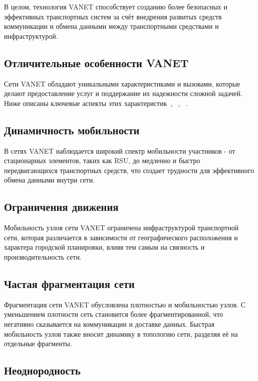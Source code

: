 В целом, технология VANET способствует созданию более безопасных и эффективных транспортных систем за счёт внедрения развитых средств коммуникации и обмена данными между транспортными средствами и инфраструктурой.

\newpage

\subsection*{Отличительные особенности VANET}

Сети VANET обладают уникальными характеристиками и вызовами, которые делают предоставление услуг и поддержание их надежности сложной задачей. Ниже описаны ключевые аспекты этих характеристик~\cite{hamdi2020review}, ~\cite{karagiannis2011vehicular}, ~\cite{raw2013security}.

\subsection*{Динамичность мобильности}

В сетях VANET наблюдается широкий спектр мобильности участников - от стационарных элементов, таких как RSU, до медленно и быстро передвигающихся транспортных средств, что создает трудности для эффективного обмена данными внутри сети.

\subsection*{Ограничения движения}

Мобильность узлов сети VANET ограничена инфраструктурой транспортной сети, которая различается в зависимости от географического расположения и характера городской планировки, влияя тем самым на связность и производительность сети.

\subsection*{Частая фрагментация сети}

Фрагментация сети VANET обусловлена плотностью и мобильностью узлов. С уменьшением плотности сеть становится более фрагментированной, что негативно сказывается на коммуникации и доставке данных. Быстрая мобильность узлов также вносит динамику в топологию сети, разделяя её на отдельные фрагменты.

\subsection*{Неоднородность} 

